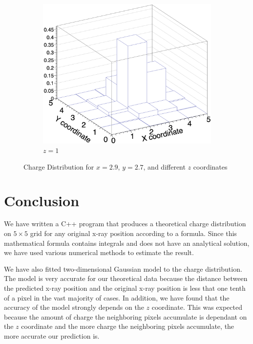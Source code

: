 \documentclass{article}
\begin{document}
\begin{figure}[H]
\begin{subfigure}{.33\textwidth}
  \centering
  \includegraphics[width=1\linewidth]{images/z1.png}
  \caption{$z=1$}
  \label{fig:z1}
\end{subfigure}
\caption{Charge Distribution for $x=2.9$, $y=2.7$, and different $z$ coordinates}
\label{fig:z}
\end{figure}



\section{Conclusion}
We have written a C++ program that produces a theoretical charge distribution on $5\times 5$ grid for any original x-ray position according to a formula. Since this mathematical formula contains integrals and does not have an analytical solution, we have used various numerical methods to estimate the result.

We have also fitted two-dimensional Gaussian model to the charge distribution. The model is very accurate for our theoretical data because the distance between the predicted x-ray position and the original x-ray position is less that one tenth of a pixel in the vast majority of cases. In addition, we have found that the accuracy of the model strongly depends on the $z$ coordinate. This was expected because the amount of charge the neighboring pixels accumulate is dependant on the $z$ coordinate and the more charge the neighboring pixels accumulate, the more accurate our prediction is.
\end{document}

